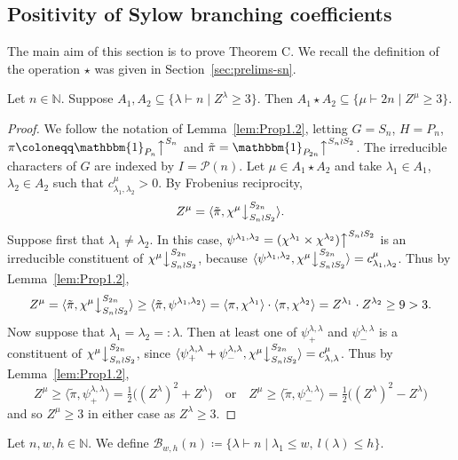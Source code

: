 \documentclass[ALCO, Unicode]{cedram}
\newcommand{\triv}{\mathbbm{1}}
\newcommand{\down}{\big\downarrow}
\newcommand{\up}{\big\uparrow}
\newcommand{\cB}{\mathcal{B}}
\newcommand{\cP}{\mathcal{P}}
\newcommand{\N}{\mathbb{N}}
\begin{document}
\subsection{Positivity of Sylow branching coefficients}\label{sec:limit}
The main aim of this section is to prove Theorem C. 
We recall the definition of the operation $\star$ was given in Section~\ref{sec:prelims-sn}.
\begin{lemma}\label{lem:SBC>=3}
	Let $n\in\N$. Suppose $A_1, A_2\subseteq\{\lambda\vdash n\mid Z^\lambda\ge 3 \}$. Then $A_1\star A_2\subseteq\{\mu\vdash 2n\mid Z^\mu\ge 3\}$.
\end{lemma}

\begin{proof}
	We follow the notation of Lemma~\ref{lem:Prop1.2}, letting $G=S_n$, $H=P_n$, $\pi\coloneqq \triv_{P_n}\up^{S_n}$ and $\tilde{\pi}=\triv_{P_{2n}}\up^{S_n\wr S_2}$. The irreducible characters of $G$ are indexed by $I=\cP(n)$.
	Let $\mu\in A_1\star A_2$ and take $\lambda_1\in A_1$, $\lambda_2\in A_2$ such that $c^\mu_{\lambda_1,\lambda_2 }>0$. By Frobenius reciprocity, 
	\[ Z^\mu = \langle\tilde{\pi},\chi^\mu\down^{S_{2n}}_{S_n\wr S_2}\rangle. \]
	Suppose first that $\lambda_1\neq\lambda_2$. In this case, $\psi^{\lambda_1,\lambda_2}=(\chi^{\lambda_1}\times\chi^{\lambda_2})\up^{S_n\wr S_2}$ is an irreducible constituent of $\chi^\mu\down^{S_{2n}}_{S_n\wr S_2}$, because $\langle\psi^{\lambda_1,\lambda_2},\chi^\mu\down^{S_{2n}}_{S_n\wr S_2}\rangle=c^\mu_{\lambda_1,\lambda_2}$. Thus by Lemma~\ref{lem:Prop1.2},
	\[ Z^{\mu} = \langle\tilde{\pi},\chi^\mu\down^{S_{2n}}_{S_n\wr S_2}\rangle \geq \langle\tilde{\pi},\psi^{\lambda_1,\lambda_2}\rangle = \langle\pi,\chi^{\lambda_1}\rangle \cdot \langle\pi,\chi^{\lambda_2}\rangle = Z^{\lambda_1}\cdot Z^{\lambda_2} \geq 9>3. \]
	Now suppose that $\lambda_1=\lambda_2 =:\lambda$. Then at least one of $\psi^{\lambda,\lambda}_{+}$ and $\psi^{\lambda,\lambda}_{-}$ is a constituent of $\chi^\mu\down^{S_{2n}}_{S_n\wr S_2}$, since $\langle\psi^{\lambda,\lambda}_{+}+\psi^{\lambda,\lambda}_{-},\chi^\mu\down^{S_{2n}}_{S_n\wr S_2}\rangle = c^\mu_{\lambda,\lambda}$. Thus by Lemma~\ref{lem:Prop1.2},
	\[ Z^\mu \ge \langle \tilde{\pi}, \psi^{\lambda,\lambda}_+\rangle = \tfrac{1}{2}\big((Z^\lambda)^2+Z^\lambda\big) \quad\text{or}\quad Z^\mu \ge \langle \tilde{\pi}, \psi^{\lambda,\lambda}_-\rangle = \tfrac{1}{2}\big((Z^\lambda)^2-Z^\lambda\big) \]
	and so $Z^\mu\ge 3$ in either case as $Z^\lambda\ge 3$.
\end{proof}

\begin{definition}
	Let $n,w,h\in\N$. We define $\cB_{w,h}(n)\coloneqq \{\lambda\vdash n\mid \lambda_1\le w,\ l(\lambda)\le h\}.$
\end{definition}
\end{document}
